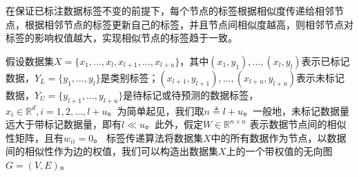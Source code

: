 在保证已标注数据标签不变的前提下，每个节点的标签根据相似度传递给相邻节点，根据相邻节点的标签更新自己的标签，并且节点间相似度越高，则相邻节点对
标签的影响权值越大，实现相似节点的标签趋于一致。

假设数据集$X=\{x_1,\ldots,x_l,x_{l+1},\ldots,x_{l+u}\}$，其中$(x_1,y_1),\ldots,(x_l,y_l)$表示已标记数据，$Y_L=\{y_1,\ldots,y_l\}$是类别标签；$(x_{l+1},y_{l+1}),\ldots,(x_{l+u},y_{l+u})$表示未标记数据，$Y_U=\{y_{l+1},\ldots,y_{l+u}\}$是待标记或待预测的数据标签，$x_i\in \mathbb R^d, i=1,2,\ldots, l+u$。为简单起见，我们取$n\triangleq l+u$。一般地，未标记数据量远大于带标记数据量，即有$l\ll u$。此外，假定$W\in \mathbb R^{n\times n}$ 表示数据节点间的相似性矩阵，且有$w_{ii}=0$。
标签传递算法将数据集$X$中的所有数据作为节点，以数据间的相似性作为边的权值，我们可以构造出数据集$X$上的一个带权值的无向图$G=(V,E)$。

